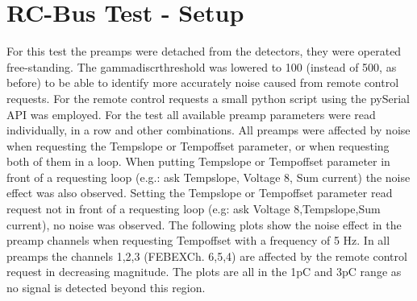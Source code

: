 \documentclass{report}
\begin{document}
\newpage
\clearpage


\section{RC-Bus Test - Setup}
For this test the preamps were detached from the detectors, they were operated free-standing. The gamma\textunderscore discr\textunderscore threshold was lowered to 100  (instead of 500, as before) to be able to identify more accurately noise caused from remote control requests. For the remote control requests a small python script using the pySerial API was employed. For the test all available preamp parameters were read individually, in a row and other combinations. All preamps were affected by noise when requesting the \dq Temp\textunderscore slope \dq{} or \dq Temp\textunderscore offset \dq{} parameter, or when requesting both of them in a loop. When putting \dq Temp\textunderscore slope \dq{} or \dq Temp\textunderscore offset \dq{} parameter in front of a requesting loop (e.g.: ask Temp\textunderscore slope, Voltage 8, Sum current) the noise effect was also observed. Setting the \dq Temp\textunderscore slope\dq{} or \dq Temp\textunderscore offset\dq{} parameter read request not in front of a requesting loop (e.g: ask Voltage 8,Temp\textunderscore slope,Sum current), no noise was observed.\newline
The following plots show the noise effect in the preamp channels  when requesting \dq Temp\textunderscore offset\dq{} with a frequency of 5 Hz. In all preamps the channels 1,2,3 (FEBEXCh. 6,5,4) are affected by the remote control request in decreasing magnitude.\newline
The plots are all in the 1pC and 3pC range as no signal is detected beyond this region.\newline
\end{document}
